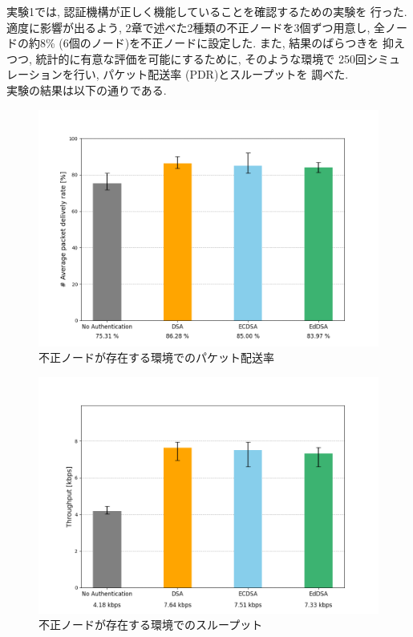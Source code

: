 実験1では, 認証機構が正しく機能していることを確認するための実験を
行った. 適度に影響が出るよう, 2章で述べた2種類の不正ノードを3個ずつ用意し, 
全ノードの約8\% (6個のノード)を不正ノードに設定した. また, 結果のばらつきを
抑えつつ, 統計的に有意な評価を可能にするために, そのような環境で
250回シミュレーションを行い, パケット配送率 (PDR)とスループットを
調べた. \\
\indent 実験の結果は以下の通りである. \\

\newpage
\begin{figure}
  \centering
  \includegraphics[width=1\textwidth]{figures/exp1_pdr.png}
  \caption{不正ノードが存在する環境でのパケット配送率}
  \label{fig:exp1_pdr}
\end{figure}
\clearpage
\begin{figure}
  \centering
  \includegraphics[width=1\textwidth]{figures/exp1_throughput.png}
  \caption{不正ノードが存在する環境でのスループット}
  \label{fig:exp1_throughput}
\end{figure}


